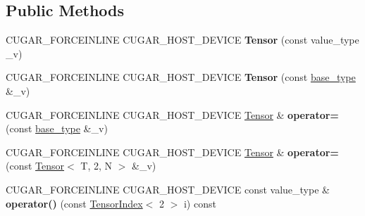 \subsection*{Public Methods}
\begin{DoxyCompactItemize}
\item 
\mbox{\label{structcugar_1_1_tensor_3_01_t_00_012_00_01_n_01_4_a0efe09dc71a9116b02b99823da6db430}} 
C\+U\+G\+A\+R\+\_\+\+F\+O\+R\+C\+E\+I\+N\+L\+I\+NE C\+U\+G\+A\+R\+\_\+\+H\+O\+S\+T\+\_\+\+D\+E\+V\+I\+CE {\bfseries Tensor} (const value\+\_\+type \+\_\+v)
\item 
\mbox{\label{structcugar_1_1_tensor_3_01_t_00_012_00_01_n_01_4_ab20e4b83c3eb9ce115f279599e91eb08}} 
C\+U\+G\+A\+R\+\_\+\+F\+O\+R\+C\+E\+I\+N\+L\+I\+NE C\+U\+G\+A\+R\+\_\+\+H\+O\+S\+T\+\_\+\+D\+E\+V\+I\+CE {\bfseries Tensor} (const \hyperlink{structcugar_1_1_matrix}{base\+\_\+type} \&\+\_\+v)
\item 
\mbox{\label{structcugar_1_1_tensor_3_01_t_00_012_00_01_n_01_4_acbd21c5f8cc244cc89bb98d9d6555a6f}} 
C\+U\+G\+A\+R\+\_\+\+F\+O\+R\+C\+E\+I\+N\+L\+I\+NE C\+U\+G\+A\+R\+\_\+\+H\+O\+S\+T\+\_\+\+D\+E\+V\+I\+CE \hyperlink{structcugar_1_1_tensor}{Tensor} \& {\bfseries operator=} (const \hyperlink{structcugar_1_1_matrix}{base\+\_\+type} \&\+\_\+v)
\item 
\mbox{\label{structcugar_1_1_tensor_3_01_t_00_012_00_01_n_01_4_ad7b99d5d30434165e1a4adc922f53f05}} 
C\+U\+G\+A\+R\+\_\+\+F\+O\+R\+C\+E\+I\+N\+L\+I\+NE C\+U\+G\+A\+R\+\_\+\+H\+O\+S\+T\+\_\+\+D\+E\+V\+I\+CE \hyperlink{structcugar_1_1_tensor}{Tensor} \& {\bfseries operator=} (const \hyperlink{structcugar_1_1_tensor}{Tensor}$<$ T, 2, N $>$ \&\+\_\+v)
\item 
\mbox{\label{structcugar_1_1_tensor_3_01_t_00_012_00_01_n_01_4_a9ffd6b5d3aa0f5710799245aca0744ec}} 
C\+U\+G\+A\+R\+\_\+\+F\+O\+R\+C\+E\+I\+N\+L\+I\+NE C\+U\+G\+A\+R\+\_\+\+H\+O\+S\+T\+\_\+\+D\+E\+V\+I\+CE const value\+\_\+type \& {\bfseries operator()} (const \hyperlink{structcugar_1_1_tensor_index}{Tensor\+Index}$<$ 2 $>$ i) const
\item 
\mbox{\label{structcugar_1_1_tensor_3_01_t_00_012_00_01_n_01_4_a38b60c3c12a1b4e79a51fdac4ec78c5d}} 

\end{DoxyCompactItemize}
